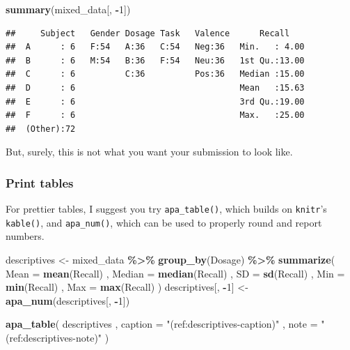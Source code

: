 \documentclass[
  man,floatsintext]{apa6}
\newenvironment{Shaded}{\begin{snugshade}}{\end{snugshade}}
\newcommand{\AttributeTok}[1]{\textcolor[rgb]{0.13,0.29,0.53}{#1}}
\newcommand{\DecValTok}[1]{\textcolor[rgb]{0.00,0.00,0.81}{#1}}
\newcommand{\FunctionTok}[1]{\textcolor[rgb]{0.13,0.29,0.53}{\textbf{#1}}}
\newcommand{\NormalTok}[1]{#1}
\newcommand{\OtherTok}[1]{\textcolor[rgb]{0.56,0.35,0.01}{#1}}
\newcommand{\SpecialCharTok}[1]{\textcolor[rgb]{0.81,0.36,0.00}{\textbf{#1}}}
\newcommand{\StringTok}[1]{\textcolor[rgb]{0.31,0.60,0.02}{#1}}
\begin{document}
\begin{Shaded}
\begin{Highlighting}[]
\FunctionTok{summary}\NormalTok{(mixed\_data[, }\SpecialCharTok{{-}}\DecValTok{1}\NormalTok{])}
\end{Highlighting}
\end{Shaded}

\begin{verbatim}
##     Subject   Gender Dosage Task   Valence      Recall     
##  A      : 6   F:54   A:36   C:54   Neg:36   Min.   : 4.00  
##  B      : 6   M:54   B:36   F:54   Neu:36   1st Qu.:13.00  
##  C      : 6          C:36          Pos:36   Median :15.00  
##  D      : 6                                 Mean   :15.63  
##  E      : 6                                 3rd Qu.:19.00  
##  F      : 6                                 Max.   :25.00  
##  (Other):72
\end{verbatim}

But, surely, this is not what you want your submission to look like.

\subsubsection{Print tables}\label{print-tables}

For prettier tables, I suggest you try \texttt{apa\_table()}, which builds on \texttt{knitr}'s \texttt{kable()}, and \texttt{apa\_num()}, which can be used to properly round and report numbers.





\begin{Shaded}
\begin{Highlighting}[]
\NormalTok{descriptives }\OtherTok{\textless{}{-}}\NormalTok{ mixed\_data }\SpecialCharTok{\%\textgreater{}\%}
  \FunctionTok{group\_by}\NormalTok{(Dosage) }\SpecialCharTok{\%\textgreater{}\%}
  \FunctionTok{summarize}\NormalTok{(}
    \AttributeTok{Mean =} \FunctionTok{mean}\NormalTok{(Recall)}
\NormalTok{    , }\AttributeTok{Median =} \FunctionTok{median}\NormalTok{(Recall)}
\NormalTok{    , }\AttributeTok{SD =} \FunctionTok{sd}\NormalTok{(Recall)}
\NormalTok{    , }\AttributeTok{Min =} \FunctionTok{min}\NormalTok{(Recall)}
\NormalTok{    , }\AttributeTok{Max =} \FunctionTok{max}\NormalTok{(Recall)}
\NormalTok{  )}
\NormalTok{descriptives[, }\SpecialCharTok{{-}}\DecValTok{1}\NormalTok{] }\OtherTok{\textless{}{-}} \FunctionTok{apa\_num}\NormalTok{(descriptives[, }\SpecialCharTok{{-}}\DecValTok{1}\NormalTok{])}

\FunctionTok{apa\_table}\NormalTok{(}
\NormalTok{  descriptives}
\NormalTok{  , }\AttributeTok{caption =} \StringTok{"(ref:descriptives{-}caption)"}
\NormalTok{  , }\AttributeTok{note =} \StringTok{"(ref:descriptives{-}note)"}
\NormalTok{)}
\end{Highlighting}
\end{Shaded}
\end{document}
